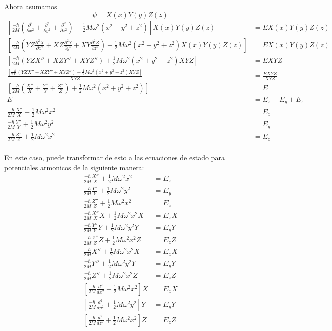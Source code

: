 \documentclass{report}
\begin{document}
Ahora asumamos \[\psi = X(x)Y(y)Z(z)\]
\begin{align*}
  \left[\frac{-\hbar}{2M}\left(  \frac{\partial^2}{\partial x^2} + \frac{\partial^2}{\partial y^2} + \frac{\partial^2}{\partial z^2}\right) + \frac{1}{2}M\omega^2 \left(x^2 + y^2 + z^2\right)\right]X(x)Y(y)Z(z) &= EX(x)Y(y)Z(z)\\
  \left[\frac{-\hbar}{2M}\left(  YZ\frac{\partial^2 X}{\partial x^2} + XZ\frac{\partial^2 Y}{\partial y^2} + XY\frac{\partial^2 Z}{\partial z^2}\right) + \frac{1}{2}M\omega^2 \left(x^2 + y^2 + z^2\right)X(x)Y(y)Z(z)\right] &= EX(x)Y(y)Z(z)\\
  \left[\frac{-\hbar}{2M}\left(  YZX'' + XZY'' +  XYZ''\right) + \frac{1}{2}M\omega^2 \left(x^2 + y^2 + z^2\right)XYZ\right] &= EXYZ\\
  \frac{\left[\frac{-\hbar}{2M}\left(  YZX'' + XZY'' +  XYZ''\right) + \frac{1}{2}M\omega^2 \left(x^2 + y^2 + z^2\right)XYZ\right]}{XYZ} &= \frac{EXYZ}{XYZ}\\
  \left[\frac{-\hbar}{2M}\left(  \frac{X''}{X} + \frac{Y''}{Y} +  \frac{Z''}{Z}\right) + \frac{1}{2}M\omega^2 \left(x^2 + y^2 + z^2\right)\right] &= E\\
  E &= E_x + E_y + E_z\\
  \frac{-\hbar}{2M}\frac{X''}{X} + \frac{1}{2}M\omega^2x^2 &= E_x\\
  \frac{-\hbar}{2M}\frac{Y''}{Y} + \frac{1}{2}M\omega^2y^2 &= E_y\\
  \frac{-\hbar}{2M}\frac{Z''}{Z} + \frac{1}{2}M\omega^2x^2 &= E_z\\
\end{align*}

En este caso, puede transformar de esto a las ecuaciones de estado para potenciales armonicos de la siguiente manera:
\begin{align*}
  \frac{-\hbar}{2M}\frac{X''}{X} + \frac{1}{2}M\omega^2x^2 &= E_x\\
  \frac{-\hbar}{2M}\frac{Y''}{Y} + \frac{1}{2}M\omega^2y^2 &= E_y\\
  \frac{-\hbar}{2M}\frac{Z''}{Z} + \frac{1}{2}M\omega^2x^2 &= E_z\\
  \frac{-\hbar}{2M}\frac{X''}{X}X + \frac{1}{2}M\omega^2x^2X &= E_xX\\
  \frac{-\hbar}{2M}\frac{Y''}{Y}Y + \frac{1}{2}M\omega^2y^2Y &= E_yY\\
  \frac{-\hbar}{2M}\frac{Z''}{Z}Z + \frac{1}{2}M\omega^2x^2Z &= E_zZ\\
  \frac{-\hbar}{2M}X'' + \frac{1}{2}M\omega^2x^2X &= E_xX\\
  \frac{-\hbar}{2M}Y'' + \frac{1}{2}M\omega^2y^2Y &= E_yY\\
  \frac{-\hbar}{2M}Z'' + \frac{1}{2}M\omega^2x^2Z &= E_zZ\\
  \left[\frac{-\hbar}{2M}\frac{d^2}{dx^2} + \frac{1}{2}M\omega^2x^2\right]X &= E_xX\\
  \left[\frac{-\hbar}{2M}\frac{d^2}{dy^2} + \frac{1}{2}M\omega^2y^2\right]Y &= E_yY\\
  \left[\frac{-\hbar}{2M}\frac{d^2}{dz^2} + \frac{1}{2}M\omega^2x^2\right]Z &= E_zZ\\
\end{align*}
\end{document}

